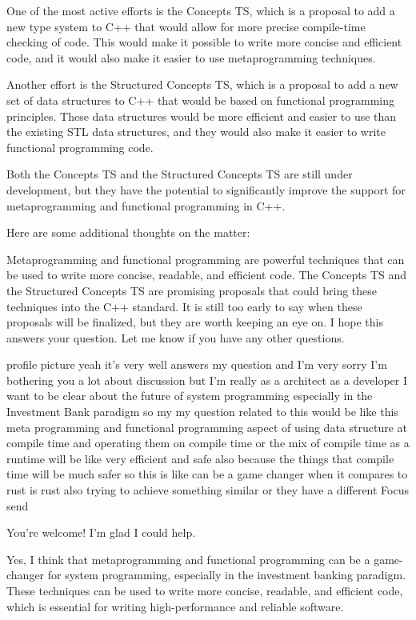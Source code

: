 \documentclass[11pt]{article}
\begin{document}
One of the most active efforts is the Concepts TS, which is a proposal to add a new type system to C++ that would allow for more precise compile-time checking of code. This would make it possible to write more concise and efficient code, and it would also make it easier to use metaprogramming techniques.

Another effort is the Structured Concepts TS, which is a proposal to add a new set of data structures to C++ that would be based on functional programming principles. These data structures would be more efficient and easier to use than the existing STL data structures, and they would also make it easier to write functional programming code.

Both the Concepts TS and the Structured Concepts TS are still under development, but they have the potential to significantly improve the support for metaprogramming and functional programming in C++.

Here are some additional thoughts on the matter:

Metaprogramming and functional programming are powerful techniques that can be used to write more concise, readable, and efficient code.
The Concepts TS and the Structured Concepts TS are promising proposals that could bring these techniques into the C++ standard.
It is still too early to say when these proposals will be finalized, but they are worth keeping an eye on.
I hope this answers your question. Let me know if you have any other questions.

profile picture
yeah it's very well answers my question and I'm very sorry I'm bothering you a lot about discussion but I'm really as a architect as a developer I want to be clear about the future of
system programming
especially in the Investment Bank paradigm
so my my question related to this would be like
this meta programming and functional programming aspect of using
data structure at compile time and operating them on compile time or the mix of compile time as a runtime
will be like very efficient and
safe also because the things that compile time will
be much safer so this is like
can be a game changer when it compares to rust is rust also trying to
achieve something similar or they have a different Focus send

You're welcome! I'm glad I could help.

Yes, I think that metaprogramming and functional programming can be a game-changer for system programming, especially in the investment banking paradigm. These techniques can be used to write more concise, readable, and efficient code, which is essential for writing high-performance and reliable software.
\end{document}
